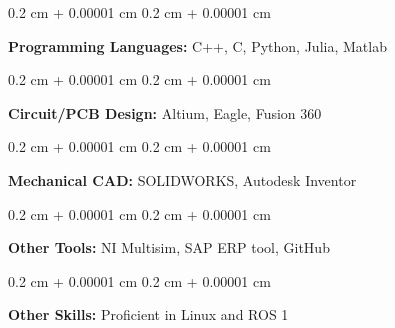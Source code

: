 \documentclass[10pt, letterpaper]{article}
\newenvironment{onecolentry}{
    \begin{adjustwidth}{
        0.2 cm + 0.00001 cm
    }{
        0.2 cm + 0.00001 cm
    }
}{
    \end{adjustwidth}
} %
\begin{document}
       
        \begin{onecolentry}
            \textbf{Programming Languages:} C++, C, Python, Julia, Matlab
        \end{onecolentry}

        \vspace{0.2 cm}

        \begin{onecolentry}
            \textbf{Circuit/PCB Design:} Altium, Eagle, Fusion 360
        \end{onecolentry}
        
        \vspace{0.2 cm}

        \begin{onecolentry}
            \textbf{Mechanical CAD:} SOLIDWORKS, Autodesk Inventor 
        \end{onecolentry}
        
        \vspace{0.2 cm}
        
        \begin{onecolentry}
            \textbf{Other Tools:} NI Multisim, SAP ERP tool, GitHub
        \end{onecolentry}

        \vspace{0.2 cm}
        
        \begin{onecolentry}
            \textbf{Other Skills:} Proficient in Linux and ROS 1
        \end{onecolentry}
    
\end{document}

